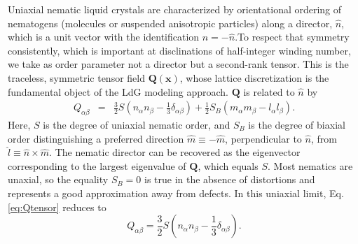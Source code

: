 \documentclass[utf8]{frontiersFPHY} %
\newcommand{\Q}{\mathbf{Q}}
\begin{document}
Uniaxial nematic liquid crystals are characterized by orientational ordering of nematogens (molecules or suspended anisotropic particles) along a director, $\hat{n}$, which is a unit vector with the identification $\hat{n}=-\hat{n}$.To respect that symmetry consistently, which is important at disclinations of half-integer winding number, we take as order parameter not a director but a second-rank tensor. %
This is the traceless, symmetric tensor field  $\Q(\mathbf{x})$, whose lattice discretization is the fundamental object of the LdG modeling approach.  $\Q$  is related to $\hat n $ by \citep{mottram2014introduction}
\begin{eqnarray}\label{eq:Qtensor}
Q_{\alpha\beta} &=& %
\frac{3}{2}S\left(n_\alpha n_\beta-\frac{1}{3}\delta_{\alpha\beta}\right) +\frac{1}{2} S_B(m_\alpha m_\beta - l_\alpha l_\beta).
\end{eqnarray}
Here, $S$ is the degree of uniaxial nematic order, and $S_B$ is the degree of biaxial order distinguishing a preferred direction $\hat m\equiv - \hat m $, perpendicular to $\hat n$, from $\hat l \equiv \hat n \times \hat m$. The nematic director can be recovered as the eigenvector corresponding to the largest eigenvalue of $\Q$, which equals $S$. Most nematics are unaxial, so the equality $S_B=0$ is true in the absence of distortions and represents a good approximation away from defects. In this uniaxial limit, Eq. \ref{eq:Qtensor} reduces to 
\begin{equation}
Q_{\alpha\beta}  = \frac{3}{2}S\left(n_\alpha n_\beta-\frac{1}{3}\delta_{\alpha\beta}\right). 
\end{equation}
\end{document}
